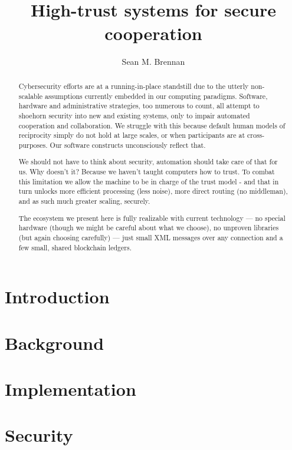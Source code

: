 \documentclass[10pt,twoside]{article}
\title{\textbf{\huge \projectName}\\ High-trust systems for secure cooperation}
\author{Sean M. Brennan}
\date{\monthname{} \the\year}
\begin{document}
	
\TekFiveTitle

\begin{abstract}
	Cybersecurity efforts are at a running-in-place standstill due to the utterly non-scalable assumptions currently embedded in our computing paradigms.
	Software, hardware and administrative strategies, too numerous to count, all attempt to shoehorn security into new and existing systems, only to impair automated cooperation and collaboration.
	We struggle with this because default human models of reciprocity simply do not hold at large scales, or when participants are at cross-purposes.
	Our software constructs unconsciously reflect that.
	
	We should not have to think about security, automation should take care of that for us.
	Why doesn't it?
	Because we haven't taught computers how to trust.
	To combat this limitation we allow the machine to be in charge of the trust model - and that in turn unlocks more efficient processing (less noise), more direct routing (no middleman), and as such much greater scaling, securely.
		
	The ecosystem we present here is fully realizable with current technology --- no special hardware (though we might be careful about what we choose), no unproven libraries (but again choosing carefully) --- just small XML messages over any connection and a few small, shared blockchain ledgers.
\end{abstract}

\show\SCENARIO

\section{Introduction}\label{sec:intro}


\section{Background}\label{sec:background}


\section{Implementation}\label{sec:implementation}


\section{Security}\label{sec:vectors}

\end{document}
